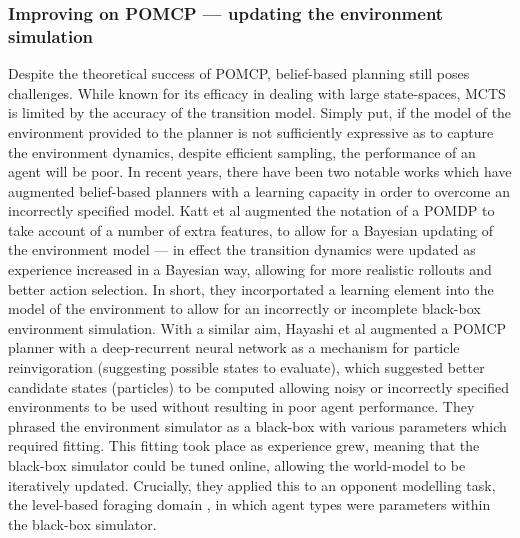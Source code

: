 \subsubsection{Improving on POMCP --- updating the environment simulation}  
Despite the theoretical success of POMCP, belief-based planning still poses challenges. 
While known for its efficacy in dealing with large state-spaces, MCTS is limited by the accuracy of the transition model. Simply put, if the model of the environment provided to the planner is not sufficiently expressive as to capture the environment dynamics, despite efficient sampling, the performance of an agent will be poor. 
\newline \newline
In recent years, there have been two notable works which have augmented belief-based planners with a learning capacity in order to overcome an incorrectly specified model. 
\newline \newline
Katt et al \cite{Katt2017} augmented the notation of a POMDP to take account of a number of extra features, to allow for a Bayesian updating of the environment model --- in effect the transition dynamics were updated as experience increased in a Bayesian way, allowing for more realistic rollouts and better action selection. In short, they incorportated a learning element into the model of the environment to allow for an incorrectly or incomplete black-box environment simulation. 
\newline \newline
With a similar aim, Hayashi et al \cite{Hayashi_et_al2020} augmented a POMCP planner with a deep-recurrent neural network as a mechanism for particle reinvigoration (suggesting possible states to evaluate), which suggested better candidate states (particles) to be computed allowing noisy or incorrectly specified environments to be used without resulting in poor agent performance. They phrased the environment simulator as a black-box with various parameters which required fitting. This fitting took place as experience grew, meaning that the black-box simulator could be tuned online, allowing the world-model to be iteratively updated. Crucially, they applied this to an opponent modelling task, the level-based foraging domain \cite{Papoudakis2020,Barrett2015}, in which agent types were parameters within the black-box simulator. 

